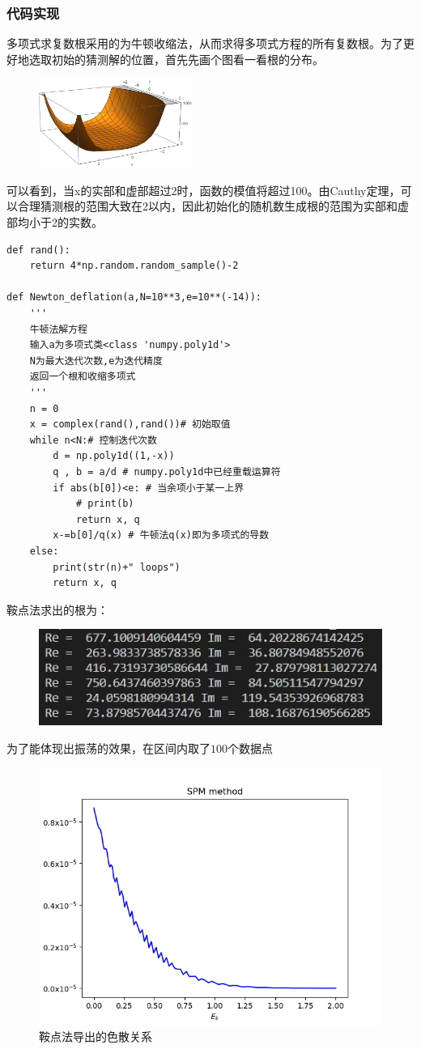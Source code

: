 \documentclass[a4paper]{ctexart}
\begin{document}
\subsubsection{代码实现}
多项式求复数根采用的为牛顿收缩法，从而求得多项式方程的所有复数根。为了更好地选取初始的猜测解的位置，首先先画个图看一看根的分布。
\begin{figure}[hbt]
\centering
\includegraphics[width=5cm]{./fig/plot_1.eps}
\end{figure}
可以看到，当x的实部和虚部超过2时，函数的模值将超过100。由Cauthy定理，可以合理猜测根的范围大致在2以内，因此初始化的随机数生成根的范围为实部和虚部均小于2的实数。
\begin{lstlisting}
def rand():
	return 4*np.random.random_sample()-2

def Newton_deflation(a,N=10**3,e=10**(-14)):
	'''
	牛顿法解方程
	输入a为多项式类<class 'numpy.poly1d'>
	N为最大迭代次数,e为迭代精度
	返回一个根和收缩多项式
	'''
	n = 0
	x = complex(rand(),rand())# 初始取值
	while n<N:# 控制迭代次数
		d = np.poly1d((1,-x))
		q , b = a/d # numpy.poly1d中已经重载运算符
		if abs(b[0])<e: # 当余项小于某一上界
			# print(b)
			return x, q
		x-=b[0]/q(x) # 牛顿法q(x)即为多项式的导数
	else:
		print(str(n)+" loops")
		return x, q
\end{lstlisting}
鞍点法求出的根为：

\begin{figure}[hbt]
	\centering
	\includegraphics[width=12cm]{./fig/SPM_1.png}
\end{figure}
为了能体现出振荡的效果，在区间内取了$100$个数据点
\begin{figure}[hbt]
	\centering
	\includegraphics[width=12cm]{./fig/SPM_2.png}
	\caption{鞍点法导出的色散关系}
\end{figure}
\end{document}
